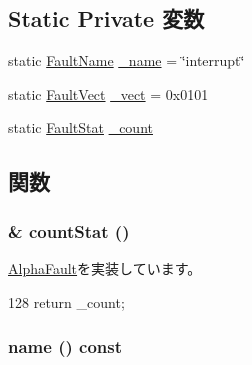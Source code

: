 \subsection*{Static Private 変数}
\begin{DoxyCompactItemize}
\item 
static \hyperlink{sim_2faults_8hh_abb196df64725e5c2568c900cf130d8d7}{FaultName} \hyperlink{classAlphaISA_1_1InterruptFault_ac79073ffcd2c66a09bcd3bd3ad206019}{\_\-name} = \char`\"{}interrupt\char`\"{}
\item 
static \hyperlink{classm5_1_1params_1_1Addr}{FaultVect} \hyperlink{classAlphaISA_1_1InterruptFault_ad9e5855b9db0b2824cf6c507be4a872e}{\_\-vect} = 0x0101
\item 
static \hyperlink{classStats_1_1Scalar}{FaultStat} \hyperlink{classAlphaISA_1_1InterruptFault_a4bff925c412f331c5aaf6a39b79619ff}{\_\-count}
\end{DoxyCompactItemize}


\subsection{関数}
\hypertarget{classAlphaISA_1_1InterruptFault_a6c79663c761ff57265459f7e3aefaf4c}{
\subsubsection[{countStat}]{\& countStat ()}}
\label{classAlphaISA_1_1InterruptFault_a6c79663c761ff57265459f7e3aefaf4c}


\hyperlink{classAlphaISA_1_1AlphaFault_a5d92ccd11b5cd6b04f02bd0a088b776c}{AlphaFault}を実装しています。


\begin{DoxyCode}
128 {return _count;}
\end{DoxyCode}
\hypertarget{classAlphaISA_1_1InterruptFault_a73adb23259baf912a81683a9790a303f}{
\subsubsection[{name}]{ name () const}}
\label{classAlphaISA_1_1InterruptFault_a73adb23259baf912a81683a9790a303f}


